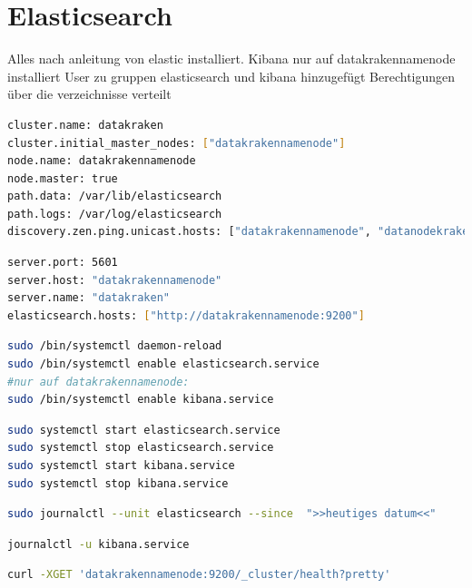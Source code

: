 \documentclass[12pt,oneside,a4paper,parskip]{scrbook}
\begin{document}
\section{Elasticsearch}
Alles nach anleitung von elastic installiert.
Kibana nur auf datakrakennamenode installiert
User zu gruppen elasticsearch und kibana hinzugefügt
Berechtigungen über die verzeichnisse verteilt

\begin{lstlisting}[caption=elasticsearch.yml,label=elasticyml,language=bash]
cluster.name: datakraken
cluster.initial_master_nodes: ["datakrakennamenode"]
node.name: datakrakennamenode
node.master: true
path.data: /var/lib/elasticsearch
path.logs: /var/log/elasticsearch
discovery.zen.ping.unicast.hosts: ["datakrakennamenode", "datanodekraken1", "datanodekraken2"]
\end{lstlisting}

\begin{lstlisting}[caption=kibana.yml,label=kibanayml,language=bash]
server.port: 5601
server.host: "datakrakennamenode"
server.name: "datakraken"
elasticsearch.hosts: ["http://datakrakennamenode:9200"]
\end{lstlisting}


\begin{lstlisting}[caption=Setup zum automatischen Start mit jedem Boot, label=boot,language=bash]
sudo /bin/systemctl daemon-reload
sudo /bin/systemctl enable elasticsearch.service
#nur auf datakrakennamenode:
sudo /bin/systemctl enable kibana.service
\end{lstlisting}
\begin{lstlisting}[caption=Manuelles Starten/ Stoppen von Elasticsearch/Kibana,label=startstopelastic,language=bash]
sudo systemctl start elasticsearch.service
sudo systemctl stop elasticsearch.service
sudo systemctl start kibana.service
sudo systemctl stop kibana.service
\end{lstlisting}


\begin{lstlisting}[caption=Befehl zum durchsuchen der Logdaten,label=logelastic,language=bash]
sudo journalctl --unit elasticsearch --since  ">>heutiges datum<<"
\end{lstlisting}

\begin{lstlisting}[caption=Befehl zum durchsuchen der Logdaten,label=logkibana,language=bash]
journalctl -u kibana.service
\end{lstlisting}

\begin{lstlisting}[caption=Statusabfrage Elasticsearch,label=statuselastic,language=bash]
curl -XGET 'datakrakennamenode:9200/_cluster/health?pretty'
\end{lstlisting}
\end{document}
